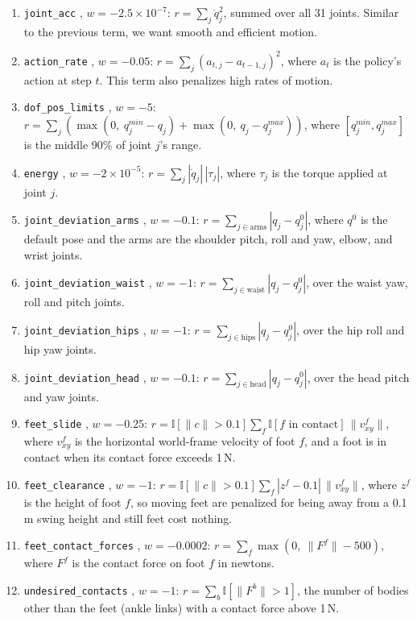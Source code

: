 \documentclass[11pt]{article}
\newcommand{\code}[1]{%
    \colorbox{mdBg}{\textcolor{mdText}{\texttt{#1}}}%
}
\begin{document}
\begin{enumerate}
    \item \code{joint\_acc}, $w=-2.5\times10^{-7}$: $r=\sum_j \ddot q_j^2$, summed over all 31 joints. Similar to the previous term, we want smooth and efficient motion.
    \item \code{action\_rate}, $w=-0.05$: $r=\sum_j (a_{t,j}-a_{t-1,j})^2$, where $a_t$ is the policy's action at step $t$. This term also penalizes high rates of motion.
    \item \code{dof\_pos\_limits}, $w=-5$: $r=\sum_j \left(\max(0,\ q_j^{min}-q_j)+\max(0,\ q_j-q_j^{max})\right)$, where $[q_j^{min}, q_j^{max}]$ is the middle 90\% of joint $j$'s range.
    \item \code{energy}, $w=-2\times10^{-5}$: $r=\sum_j |\dot q_j|\,|\tau_j|$, where $\tau_j$ is the torque applied at joint $j$.
    \item \code{joint\_deviation\_arms}, $w=-0.1$: $r=\sum_{j\in\text{arms}} |q_j-q_j^{0}|$, where $q^0$ is the default pose and the arms are the shoulder pitch, roll and yaw, elbow, and wrist joints.
    \item \code{joint\_deviation\_waist}, $w=-1$: $r=\sum_{j\in\text{waist}} |q_j-q_j^{0}|$, over the waist yaw, roll and pitch joints.
    \item \code{joint\_deviation\_hips}, $w=-1$: $r=\sum_{j\in\text{hips}} |q_j-q_j^{0}|$, over the hip roll and hip yaw joints.
    \item \code{joint\_deviation\_head}, $w=-0.1$: $r=\sum_{j\in\text{head}} |q_j-q_j^{0}|$, over the head pitch and yaw joints.
    \item \code{feet\_slide}, $w=-0.25$: $r=\mathbb{I}[\|c\|>0.1]\sum_{f} \mathbb{I}[\text{$f$ in contact}]\,\|v^f_{xy}\|$, where $v^f_{xy}$ is the horizontal world-frame velocity of foot $f$, and a foot is in contact when its contact force exceeds 1\,N.
    \item \code{feet\_clearance}, $w=-1$: $r=\mathbb{I}[\|c\|>0.1]\sum_{f} |z^f-0.1|\,\|v^f_{xy}\|$, where $z^f$ is the height of foot $f$, so moving feet are penalized for being away from a 0.1\,m swing height and still feet cost nothing.
    \item \code{feet\_contact\_forces}, $w=-0.0002$: $r=\sum_{f} \max(0,\ \|F^f\|-500)$, where $F^f$ is the contact force on foot $f$ in newtons.
    \item \code{undesired\_contacts}, $w=-1$: $r=\sum_{b} \mathbb{I}[\|F^b\|>1]$, the number of bodies other than the feet (ankle links) with a contact force above 1\,N.
\end{enumerate}
\end{document}
